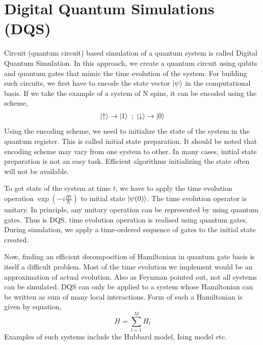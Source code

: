 \documentclass[12pt,a4paper]{report}
\begin{document}
\section{Digital Quantum Simulations (DQS)}
Circuit (quantum circuit) based simulation  of a quantum system is called Digital Quantum Simulation. In this approach, we create a quantum circuit using qubits and quantum gates that mimic the time evolution of the system. For building such circuits, we first have to encode the state vector $\ket{\psi}$ in the computational basis. If we take the example of a system of N spins, it can be encoded using the scheme,
\begin{gather*}
\ket{\uparrow} \rightarrow \ket{1} \ ; \ \ket{\downarrow} \rightarrow \ket{0}
\end{gather*}
Using the encoding scheme, we need to initialize the state of the system in the quantum register. This is called initial state preparation. It should be noted that encoding scheme may vary from one system to other. In many cases, initial state preparation is not an easy task. Efficient algorithms initializing the state often will not be available. %
 
To get state of the system at time $t$, we have to apply the time evolution operation $\exp\left(-i\frac{Ht}{\hbar}\right)$ to initial state $\ket{\psi (0)}$. The time evolution operator is unitary. In principle, any unitary operation can be represented by using quantum gates. Thus is DQS, time evolution operation is realised using quantum gates. During simulation, we apply a time-ordered sequence of gates to the initial state created.

Now, finding an efficient decomposition of Hamiltonian in quantum gate basis is itself a difficult problem. Most of the time evolution we implement would be an approximation of actual evolution. Also as Feynman pointed out, not all systems can be simulated. DQS can only be applied to a system whose Hamiltonian can be written as sum of many local interactions. Form of such a Hamiltonian is given by equation,
\begin{equation}
H= \sum_{l=1}^{M} H_{l}
\end{equation}
Examples of such systems include the Hubbard model, Ising model etc.
\end{document}
